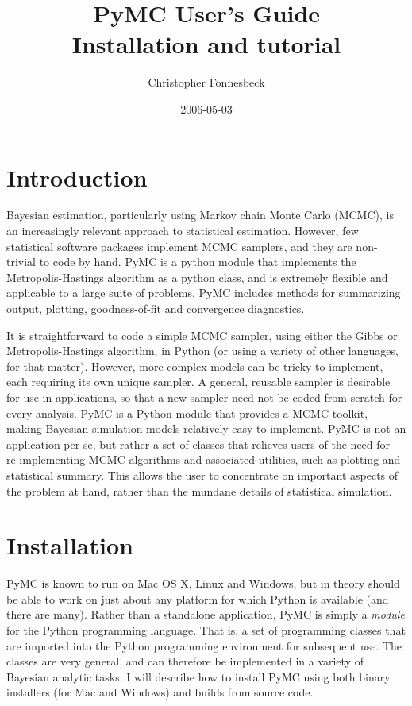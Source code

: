 \documentclass[]{book}
\title{PyMC User's Guide \\
Installation and tutorial}
\author{ Christopher Fonnesbeck }
\date{2006-05-03}
\begin{document}
\ifpdf
{}
\else
{}
\fi

\maketitle

\tableofcontents

\chapter{Introduction}

Bayesian estimation, particularly using Markov chain Monte Carlo (MCMC), is an increasingly relevant approach to statistical estimation. However, few statistical software packages implement MCMC samplers, and they are non-trivial to code by hand. PyMC is a python module that implements the Metropolis-Hastings algorithm as a python class, and is extremely flexible and applicable to a large suite of problems. PyMC includes methods for summarizing output, plotting, goodness-of-fit and convergence diagnostics.

It is straightforward to code a simple MCMC sampler, using either the Gibbs or Metropolis-Hastings algorithm, in Python (or using a variety of other languages, for that matter). However, more complex models can be tricky to implement, each requiring its own unique sampler. A general, reusable sampler is desirable for use in applications, so that a new sampler need not be coded from scratch for every analysis. PyMC is a \href{http://python.org}{Python} module that provides a MCMC toolkit, making Bayesian simulation models relatively easy to implement. PyMC is not an application per se, but rather a set of classes that relieves users of the need for re-implementing MCMC algorithms and associated utilities, such as plotting and statistical summary. This allows the user to concentrate on important aspects of the problem at hand, rather than the mundane details of statistical simulation.

\chapter{Installation}

PyMC is known to run on Mac OS X, Linux and Windows, but in theory should be able to work on just about any platform for which Python is available (and there are many). Rather than a standalone application, PyMC is simply a \emph{module} for the Python programming language. That is, a set of programming classes that are imported into the Python programming environment for subsequent use. The classes are very general, and can therefore be implemented in a variety of Bayesian analytic tasks. I will describe how to install PyMC using both binary installers (for Mac and Windows) and builds from source code.
\end{document}
